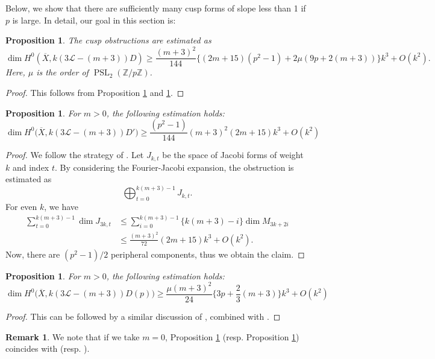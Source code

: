 \documentclass[12pt, pdftex]{amsart}
\theoremstyle{plain}
\newtheorem{prop}[thm]{Proposition}
\theoremstyle{definition}
\newtheorem{rem}[thm]{Remark}
\numberwithin{equation}{section}
\def\Z{{\mathbb Z}}
\def\dim{\mathop{\mathrm{dim}}\nolimits}
\def\L{\mathscr{L}}
\def\PSL{\mathop{\mathrm{PSL}}\nolimits}
\begin{document}
Below, we show that there are sufficiently many cusp forms of slope less than 1 if $p$ is large.
In detail, our goal in this section is:
\begin{prop}
\label{prop:cusp_obstruction}
    The cusp obstructions are estimated as 
    \[\dim H^0(\overline{X}, k(3\L-(m+3))D)\geq \frac{(m+3)^2}{144}\{(2m+15)(p^2-1) + 2\mu(9p+2(m+3))\}k^3+O(k^2).\]
    Here, $\mu$ is the order of $\PSL_2(\Z/p\Z)$.
\end{prop}
\begin{proof}
    This follows from Proposition \ref{prop:peripheral_obstruction} and \ref{prop:central_obstruction}.
\end{proof}

\begin{prop}
\label{prop:peripheral_obstruction}
For $m>0$, the following estimation holds:
\[\dim H^0\bigl(\overline{X}, k(3\L-(m+3))D'\bigr) \geq \frac{(p^2-1)}{144}(m+3)^2(2m+15)k^3 + O(k^2)\]
\end{prop}
\begin{proof}
    We follow the strategy of \cite[Proposition 3.3]{HS94}.
Let $J_{k,t}$ be the space of Jacobi forms of weight $k$ and index $t$.
By considering the Fourier-Jacobi expansion, the obstruction is estimated as 
\[\bigoplus_{t=0}^{k(m+3)-1}J_{k,t}.\]
For even $k$, we have
\begin{align*}
\sum_{t=0}^{k(m+3)-1}\dim J_{3k,t}&\leq \sum_{i=0}^{k(m+3)-1}\{k(m+3)-i\}\dim M_{3k+2i}\\
&\leq\frac{(m+3)^2}{72}(2m+15)k^3 + O(k^2).
\end{align*}
Now, there are $(p^2-1)/2$ peripheral components, thus we obtain the claim.
\end{proof}


\begin{prop}
\label{prop:central_obstruction}
For $m>0$, the following estimation holds:
\[\dim H^0\bigl(\overline{X}, k(3\L-(m+3))D(p)\bigr) \geq \frac{\mu(m+3)^2}{24}\{3p+\frac{2}{3}(m+3)\}k^3 + O(k^2)\]
\end{prop}
\begin{proof}
This can be followed by a similar discussion of \cite[Proposition 3.7]{HS94}, combined with \cite[Proposition 3.6]{HS94}.
\end{proof}


\begin{rem}
We note that if we take $m=0$, Proposition \ref{prop:peripheral_obstruction} (resp. Proposition \ref{prop:central_obstruction}) coincides with \cite[Proposition 3.3]{HS94} (resp. \cite[Proposirion 3.7]{HS94}).
\end{rem}
\end{document}
